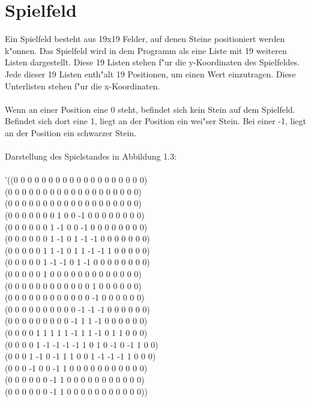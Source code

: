 \documentclass[a4paper]{scrreprt}
\begin{document}
\section{Spielfeld}
\label{sec:Spielfeld}
Ein Spielfeld besteht aus 19x19 Felder, auf denen Steine positioniert werden k"onnen. Das Spielfeld wird in dem Programm als eine Liste mit 19 weiteren Listen dargestellt. Diese 19 Listen stehen f"ur die y-Koordinaten des Spielfeldes. Jede dieser 19 Listen enth"alt 19 Positionen, um einen Wert einzutragen. Diese Unterlisten stehen f"ur die x-Koordinaten.\\\\
Wenn an einer Position eine 0 steht, befindet sich kein Stein auf dem Spielfeld. Befindet sich dort eine 1, liegt an der Position ein wei"ser Stein. Bei einer -1, liegt an der Position ein schwarzer Stein.\\
\\Darstellung des Spielstandes in Abbildung 1.3:\\\\
'((0 0 0 0 0 0 0 0 0 0 0 0 0 0 0 0 0 0 0)\\
  (0 0 0 0 0 0 0 0 0 0 0 0 0 0 0 0 0 0 0)\\
  (0 0 0 0 0 0 0 0 0 0 0 0 0 0 0 0 0 0 0)\\
  (0 0 0 0 0 0 0 1 0 0 -1 0 0 0 0 0 0 0 0)\\
  (0 0 0 0 0 0 1 -1 0 0 -1 0 0 0 0 0 0 0 0)\\
  (0 0 0 0 0 0 1 -1 0 1 -1 -1 0 0 0 0 0 0 0)\\
  (0 0 0 0 0 1 1 -1 0 1 1 -1 -1 1 0 0 0 0 0)\\
  (0 0 0 0 0 1 -1 -1 0 1 -1 0 0 0 0 0 0 0 0)\\
  (0 0 0 0 0 1 0 0 0 0 0 0 0 0 0 0 0 0 0)\\
  (0 0 0 0 0 0 0 0 0 0 0 0 1 0 0 0 0 0 0)\\
  (0 0 0 0 0 0 0 0 0 0 0 0 -1 0 0 0 0 0 0)\\
  (0 0 0 0 0 0 0 0 0 0 -1 -1 -1 0 0 0 0 0 0)\\
  (0 0 0 0 0 0 0 0 0 -1 1 1 -1 0 0 0 0 0 0)\\
  (0 0 0 0 1 1 1 1 1 -1 1 1 -1 0 1 1 0 0 0)\\
  (0 0 0 0 1 -1 -1 -1 -1 1 0 1 0 -1 0 -1 1 0 0)\\
  (0 0 0 1 -1 0 -1 1 1 0 0 1 -1 -1 -1 1 0 0 0)\\
  (0 0 0 -1 0 0 -1 1 0 0 0 0 0 0 0 0 0 0 0)\\
  (0 0 0 0 0 0 -1 1 0 0 0 0 0 0 0 0 0 0 0)\\
  (0 0 0 0 0 0 -1 1 0 0 0 0 0 0 0 0 0 0 0))\\
\end{document}
